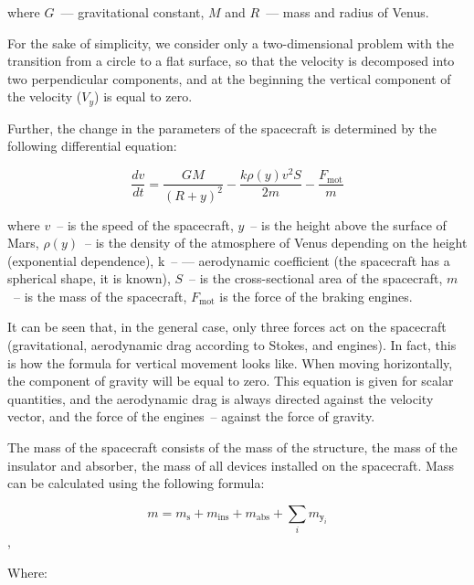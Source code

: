 \documentclass[12pt,a4paper]{article}
\begin{document}
where $G$~--- gravitational constant, $M$ and $R$~--- mass and radius of Venus.

For the sake of simplicity, we consider only a two-dimensional problem with the transition from a circle to a flat surface, so that the velocity is decomposed into two perpendicular components, and at the beginning the vertical component of the velocity ($V_y$) is equal to zero.

Further, the change in the parameters of the spacecraft is determined by the following differential equation:

$$
\frac{dv}{dt} = \frac{G M}{(R + y)^2} - \frac{k \rho(y) v^2 S}{2 m} - \frac{F_{\text{mot}}}{m}
$$

where $v$~-- is the speed of the spacecraft, $y$~-- is the height above the surface of Mars, $\rho(y)$~-- is the density of the atmosphere of Venus depending on the height (exponential dependence), k~-- —
aerodynamic coefficient (the spacecraft has a spherical shape, it is known), $S$~-- is the cross-sectional area of the spacecraft, $m$~-- is the mass of the spacecraft, $F_{\text{mot}}$ is the force of the braking engines.

It can be seen that, in the general case, only three forces act on the spacecraft (gravitational, aerodynamic drag according to Stokes, and engines). In fact, this is how the formula for vertical movement looks like. When moving horizontally, the component of gravity will be equal to zero. This equation is given for scalar quantities, and the aerodynamic drag is always directed against the velocity vector, and the force of the engines~-- against the force of gravity.

The mass of the spacecraft consists of the mass of the structure, the mass of the insulator and absorber, the mass of all devices installed on the spacecraft. Mass can be calculated using the following formula:

$$
m = m_{\text{s}} + m_{\text{ins}} + m_{\text{abs}} + \sum\limits_{i}m_{\text{у}_i}
$$,

Where:
\end{document}

